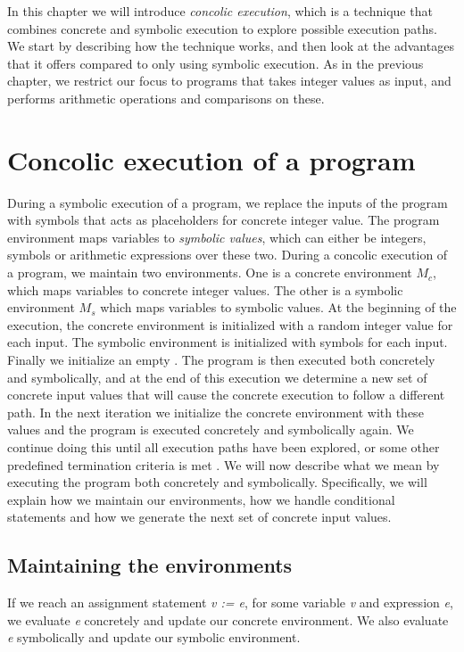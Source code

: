 In this chapter we will introduce \emph{concolic execution}, which is a technique that combines concrete and symbolic execution to explore possible execution paths. We start by describing how the technique works, and then look at the advantages that it offers compared to only using symbolic execution. As in the previous chapter, we restrict our focus to programs that takes integer values as input, and performs arithmetic operations and comparisons on these. 

\section{Concolic execution of a program}
	During a symbolic execution of a program, we replace the inputs of the program with symbols that acts as placeholders for concrete integer value. The program environment maps variables to \emph{symbolic values}, which can either be integers, symbols or arithmetic expressions over these two. During a concolic execution of a program, we maintain two environments. One is a concrete environment $M_c$, which maps variables to concrete integer values. The other is a symbolic environment $M_s$ which maps variables to symbolic values. At the beginning of the execution, the concrete environment is initialized with a random integer value for each input. The symbolic environment is initialized with symbols for each input. Finally we initialize an empty \pc. The program is then executed both concretely and symbolically, and at the end of this execution we determine a new set of concrete input values that will cause the concrete execution to follow a different path. In the next iteration we initialize the concrete environment with these values and the program is executed concretely and symbolically again. We continue doing this until all execution paths have been explored, or some other predefined termination criteria is met \cite{Godefroid:2005:DDA:1064978.1065036}. We will now describe what we mean by executing the program both concretely and symbolically. Specifically, we will explain how we maintain our environments, how we handle conditional statements and how we generate the next set of concrete input values.
	
	\subsection{Maintaining the environments} 
	
	If we reach an assignment statement \textsl{v := e}, for some variable \textsl{v} and expression \textsl{e}, we evaluate \textsl{e} concretely and update our concrete environment. We also evaluate \textsl{e} symbolically and update our symbolic environment.  
	
